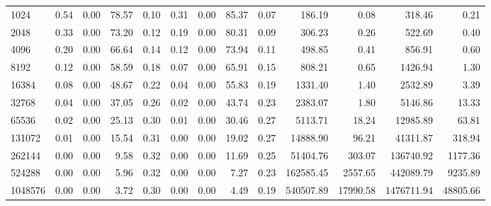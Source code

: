 \begin{tabular}{lrrrrrrrrrrrr}
1024     &        0.54 &        0.00 &         78.57 &          0.10 &           0.31 &           0.00 &        85.37 &         0.07 &           186.19 &             0.08 &          318.46 &            0.21 \\
2048     &        0.33 &        0.00 &         73.20 &          0.12 &           0.19 &           0.00 &        80.31 &         0.09 &           306.23 &             0.26 &          522.69 &            0.40 \\
4096     &        0.20 &        0.00 &         66.64 &          0.14 &           0.12 &           0.00 &        73.94 &         0.11 &           498.85 &             0.41 &          856.91 &            0.60 \\
8192     &        0.12 &        0.00 &         58.59 &          0.18 &           0.07 &           0.00 &        65.91 &         0.15 &           808.21 &             0.65 &         1426.94 &            1.30 \\
16384    &        0.08 &        0.00 &         48.67 &          0.22 &           0.04 &           0.00 &        55.83 &         0.19 &          1331.40 &             1.40 &         2532.89 &            3.39 \\
32768    &        0.04 &        0.00 &         37.05 &          0.26 &           0.02 &           0.00 &        43.74 &         0.23 &          2383.07 &             1.80 &         5146.86 &           13.33 \\
65536    &        0.02 &        0.00 &         25.13 &          0.30 &           0.01 &           0.00 &        30.46 &         0.27 &          5113.71 &            18.24 &        12985.89 &           63.81 \\
131072   &        0.01 &        0.00 &         15.54 &          0.31 &           0.00 &           0.00 &        19.02 &         0.27 &         14888.90 &            96.21 &        41311.87 &          318.94 \\
262144   &        0.00 &        0.00 &          9.58 &          0.32 &           0.00 &           0.00 &        11.69 &         0.25 &         51404.76 &           303.07 &       136740.92 &         1177.36 \\
524288   &        0.00 &        0.00 &          5.96 &          0.32 &           0.00 &           0.00 &         7.27 &         0.23 &        162585.45 &          2557.65 &       442089.79 &         9235.89 \\
1048576  &        0.00 &        0.00 &          3.72 &          0.30 &           0.00 &           0.00 &         4.49 &         0.19 &        540507.89 &         17990.58 &      1476711.94 &        48805.66 \\

\end{tabular}

